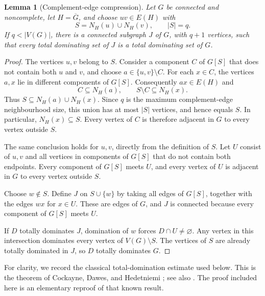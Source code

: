 \documentclass[11pt,a4paper]{article}
\newtheorem{lemma}[theorem]{Lemma}
\theoremstyle{remark}
\begin{document}
\begin{lemma}[Complement-edge compression]\label{r5:compression}
Let \(G\) be connected and noncomplete, let \(H=\overline G\), and choose
\(uv\in E(H)\) with
\[
S=N_H(u)\cup N_H(v),\qquad |S|=q.
\]
If \(q<|V(G)|\), there is a connected subgraph \(J\) of \(G\), with
\(q+1\) vertices, such that every total dominating set of \(J\) is a
total dominating set of \(G\).
\end{lemma}
\begin{proof}
The vertices \(u,v\) belong to \(S\). Consider a component \(C\) of
\(G[S]\) that does not contain both \(u\) and \(v\), and choose
\(a\in\{u,v\}\setminus C\). For each \(x\in C\), the vertices \(a,x\)
lie in different components of \(G[S]\). Consequently \(ax\in E(H)\)
and
\[
C\subseteq N_H(a),\qquad S\setminus C\subseteq N_H(x).
\]
Thus \(S\subseteq N_H(a)\cup N_H(x)\). Since \(q\) is the maximum
complement-edge neighbourhood size, this union has at most \(|S|\)
vertices, and hence equals \(S\). In particular, \(N_H(x)\subseteq S\).
Every vertex of \(C\) is therefore adjacent in \(G\) to every vertex
outside \(S\).

The same conclusion holds for \(u,v\), directly from the definition
of \(S\). Let \(U\) consist of \(u,v\) and all vertices in components
of \(G[S]\) that do not contain both endpoints. Every component of
\(G[S]\) meets \(U\), and every vertex of \(U\) is adjacent in \(G\)
to every vertex outside \(S\).

Choose \(w\notin S\). Define \(J\) on \(S\cup\{w\}\) by taking all
edges of \(G[S]\), together with the edges \(wx\) for \(x\in U\).
These are edges of \(G\), and \(J\) is connected because every
component of \(G[S]\) meets \(U\).

If \(D\) totally dominates \(J\), domination of \(w\) forces
\(D\cap U\ne\varnothing\). Any vertex in this intersection dominates
every vertex of \(V(G)\setminus S\). The vertices of \(S\) are already
totally dominated in \(J\), so \(D\) totally dominates \(G\).
\end{proof}

For clarity, we record the classical total-domination estimate used
below. This is the theorem of Cockayne, Dawes, and Hedetniemi
\cite{CDH1980}; see also \cite[Theorem~1]{HH2009}. The proof included
here is an elementary reproof of that known result.
\end{document}
